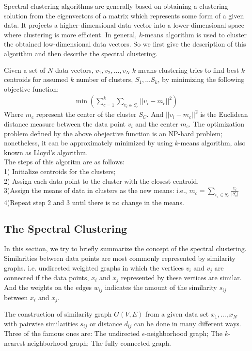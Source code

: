 \documentclass[onecolumn,notitlepage]{revtex4-1}
\begin{document}
Spectral clustering algorithms are generally based on obtaining a clustering solution from the eigenvectors of a matrix which represents some form of a given data. It projects a higher-dimensional data vector into a lower-dimensional space where clustering is more efficient. In general, $k$-means algorithm is used to cluster the obtained low-dimensional data vectors. So we first give the description of this algorithm and then describe the spectral clustering.

Given a set of $N$ data vectors, $v_{1},v_{2},\dots,v_{N}$ $k$-means clustering tries to find best $k$ centroids for assumed $k$ number of clusters, $S_{1},…S_{k}$, by minimizing the following objective function:
\begin{align}
    \min(\sum_{c=1}^{k}\sum_{v_{i}\in S_{c}}||v_i-m_c||^2)
\end{align}
Where $m_{c}$ represent the center of the cluster $S_C$. And $||v_i-m_c||^2$ is the Euclidean distance measure between the data point $v_i$ and the center $m_c$. The optimization problem defined by the above obejective function is an NP-hard problem; nonetheless, it can be approximately minimized by using $k$-means algorithm, also known as Lloyd’s algorithm.\\ The steps of this algoritm are as follows:\\
1) Initialize centroids for the clusters;\\
2) Assign each data point to the cluster with the closest centroid.\\
3)Assign the means of data in clusters as the new means: i.e., $m_c=\sum_{v_{i}\in S_c}\frac{v_i}{|S_c|}$\\
4)Repeat step 2 and 3 until there is no change in the means.\\

\subsection{The Spectral Clustering}

In this section, we try to briefly summarize the concept of the spectral clustering. Similarities between data points are most commonly represented by similarity graphs. i.e. undirected weighted graphs in which the vertices $v_i$ and $v_j$ are connected if the data points, $x_i$ and $x_j$ represented by these vertices are similar. And the weights on the edges $w_{ij}$ indicates the amount of the similarity $s_{ij}$ between $x_i$ and $x_j$.

The construction of similarity graph $G(V,E)$ from a given data set ${x_{1},...,x_{N}}$ with pairwise similarities $s_{ij}$ or distance $d_{ij}$ can be done in many different ways. Three of the famous ones are: The undirected $\epsilon$-neighborhood graph; The $k$-nearest neighborhood graph; The fully connected graph.
\end{document}
